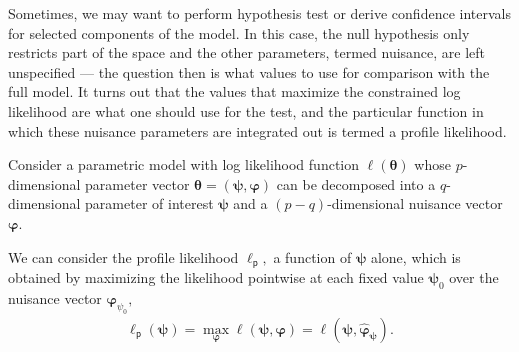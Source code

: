 \documentclass[
  11pt,
  letterpaper,
]{scrbook}
\theoremstyle{plain}
\theoremstyle{definition}
\theoremstyle{definition}
\theoremstyle{remark}
\begin{document}
Sometimes, we may want to perform hypothesis test or derive confidence
intervals for selected components of the model. In this case, the null
hypothesis only restricts part of the space and the other parameters,
termed nuisance, are left unspecified --- the question then is what
values to use for comparison with the full model. It turns out that the
values that maximize the constrained log likelihood are what one should
use for the test, and the particular function in which these nuisance
parameters are integrated out is termed a profile likelihood.

Consider a parametric model with log likelihood function
\(\ell(\boldsymbol{\theta})\) whose \(p\)-dimensional parameter vector
\(\boldsymbol{\theta}=(\boldsymbol{\psi}, \boldsymbol{\varphi})\) can be
decomposed into a \(q\)-dimensional parameter of interest
\(\boldsymbol{\psi}\) and a \((p-q)\)-dimensional nuisance vector
\(\boldsymbol{\varphi}.\)

We can consider the profile likelihood \(\ell_{\mathsf{p}},\) a function
of \(\boldsymbol{\psi}\) alone, which is obtained by maximizing the
likelihood pointwise at each fixed value \(\boldsymbol{\psi}_0\) over
the nuisance vector \(\boldsymbol{\varphi}_{\psi_0},\) \begin{align*}
\ell_{\mathsf{p}}(\boldsymbol{\psi})=\max_{\boldsymbol{\varphi}}\ell(\boldsymbol{\psi}, \boldsymbol{\varphi})=\ell(\boldsymbol{\psi}, \widehat{\boldsymbol{\varphi}}_{\boldsymbol{\psi}}).
\end{align*}
\end{document}
